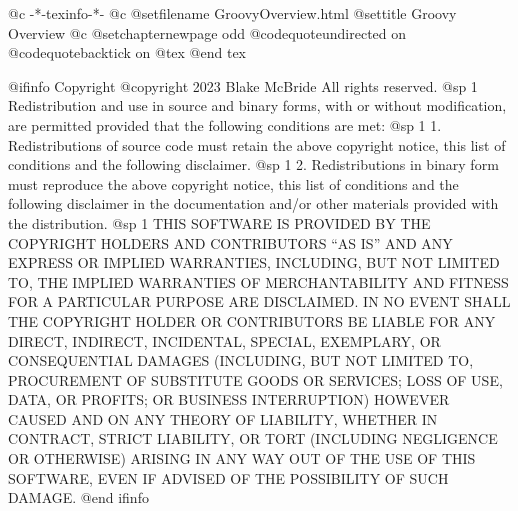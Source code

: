     @c -*-texinfo-*-
@c %
@setfilename GroovyOverview.html
@settitle Groovy Overview
@c %
@setchapternewpage odd
@codequoteundirected on
@codequotebacktick on
@tex
\global\def\linkcolor{0 0 1}  %
\global\def\urlcolor{0 0 1}   %
@end tex

@ifinfo
Copyright  @copyright{} 2023 Blake McBride
All rights reserved.
@sp 1
Redistribution and use in source and binary forms, with or without
modification, are permitted provided that the following conditions are
met:
@sp 1
1. Redistributions of source code must retain the above copyright
notice, this list of conditions and the following disclaimer.
@sp 1
2. Redistributions in binary form must reproduce the above copyright
notice, this list of conditions and the following disclaimer in the
documentation and/or other materials provided with the distribution.
@sp 1
THIS SOFTWARE IS PROVIDED BY THE COPYRIGHT HOLDERS AND CONTRIBUTORS
``AS IS'' AND ANY EXPRESS OR IMPLIED WARRANTIES, INCLUDING, BUT NOT
LIMITED TO, THE IMPLIED WARRANTIES OF MERCHANTABILITY AND FITNESS FOR
A PARTICULAR PURPOSE ARE DISCLAIMED. IN NO EVENT SHALL THE COPYRIGHT
HOLDER OR CONTRIBUTORS BE LIABLE FOR ANY DIRECT, INDIRECT, INCIDENTAL,
SPECIAL, EXEMPLARY, OR CONSEQUENTIAL DAMAGES (INCLUDING, BUT NOT
LIMITED TO, PROCUREMENT OF SUBSTITUTE GOODS OR SERVICES; LOSS OF USE,
DATA, OR PROFITS; OR BUSINESS INTERRUPTION) HOWEVER CAUSED AND ON ANY
THEORY OF LIABILITY, WHETHER IN CONTRACT, STRICT LIABILITY, OR TORT
(INCLUDING NEGLIGENCE OR OTHERWISE) ARISING IN ANY WAY OUT OF THE USE
OF THIS SOFTWARE, EVEN IF ADVISED OF THE POSSIBILITY OF SUCH DAMAGE.
@end ifinfo


